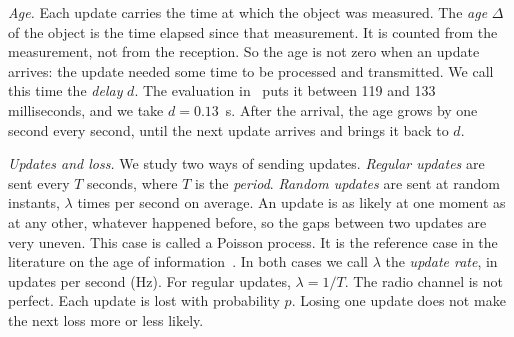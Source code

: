 \documentclass[conference]{IEEEtran}
\begin{document}
\emph{Age.} Each update carries the time at which the object was measured. The
\emph{age} $\Delta$ of the object is the time elapsed since that measurement.
It is counted from the measurement, not from the reception. So the age is not
zero when an update arrives: the update needed some time to be processed and
transmitted. We call this time the \emph{delay} $d$. The evaluation
in~\cite{volk2021} puts it between 119 and 133 milliseconds, and we take
$d=0.13$~s.
After the arrival, the age grows by one second every second, until the next
update arrives and brings it back to $d$.

\emph{Updates and loss.} We study two ways of sending updates.
\emph{Regular updates} are sent every $T$ seconds, where $T$ is the
\emph{period}. \emph{Random updates} are sent at random instants, $\lambda$
times per second on average. An update is as likely at one moment as at any
other, whatever happened before, so the gaps between two updates are very
uneven. This case is called a Poisson process. It is the reference case in the
literature on the age of information~\cite{kaul2012}. In both cases we call $\lambda$ the \emph{update
rate}, in updates per second (Hz). For regular updates, $\lambda=1/T$. The
radio channel is not perfect. Each update is lost with probability $p$.
Losing one update does not make the next loss more or less likely.
\end{document}
